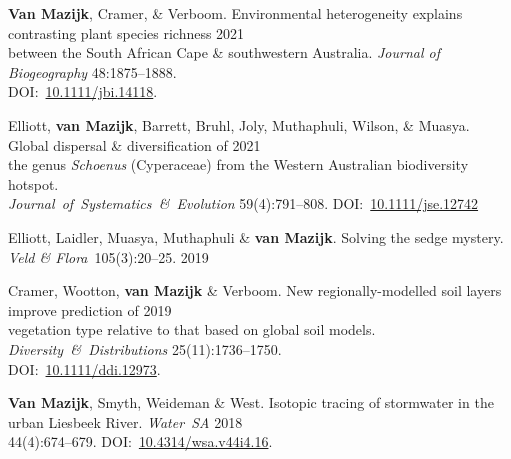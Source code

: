 \begin{hangparas}{2em}{1}

\textbf{Van Mazijk}, Cramer, \& Verboom.
Environmental heterogeneity explains contrasting plant species richness
                                                                  \hfill 2021 \\
  \hspace{2em} between the South African Cape \& southwestern Australia.
    \textit{Journal of Biogeography}
    48:1875--1888.                                                              \\
  \hspace{2em} DOI:~\href{https://doi.org/10.1111/jbi.14118}{10.1111/jbi.14118}.

Elliott, \textbf{van Mazijk}, Barrett, Bruhl,
  Joly, Muthaphuli, Wilson, \& Muasya.
Global dispersal \& diversification of                            \hfill 2021 \\
  \hspace{2em} the genus \textit{Schoenus} (Cyperaceae)
    from the Western Australian biodiversity hotspot.                         \\
  \hspace{2em} \textit{Journal~of~Systematics~\&~Evolution}
    59(4):791--808.
    DOI:~\href{https://doi.org/10.1111/jse.1274}{10.1111/jse.12742}

Elliott, Laidler, Muasya, Muthaphuli \& \textbf{van Mazijk}.
Solving the sedge mystery.
\textit{Veld \& Flora}~105(3):20--25.                             \hfill 2019

Cramer, Wootton, \textbf{van Mazijk} \& Verboom.
New regionally-modelled soil layers improve prediction of         \hfill 2019 \\
  \hspace{2em} vegetation type relative to that based on global soil models.
    \textit{Diversity~\&~Distributions}
    25(11):1736--1750.                    \\
  \hspace{2em} DOI:~\href{https://doi.org/10.1111/ddi.12973}{10.1111/ddi.12973}.

\textbf{Van Mazijk}, Smyth, Weideman \& West.
Isotopic tracing of stormwater in the urban Liesbeek River.
\textit{Water~SA}                                                 \hfill 2018 \\
  \hspace{2em} 44(4):674--679.
    DOI:~\href{https://doi.org/10.4314/wsa.v44i4.16}{10.4314/wsa.v44i4.16}.

\end{hangparas}
